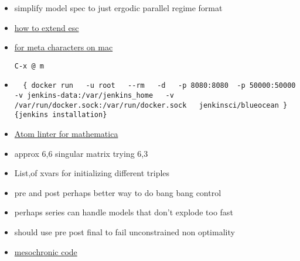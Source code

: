 \documentclass[hyperref]{labbook}
\begin{document}
\begin{itemize}
\item simplify model spec to just ergodic parallel regime format
\end{itemize}


\begin{itemize}
\item \href{https://emacs.stackexchange.com/questions/3992/how-to-extend-the-esc-m-translation-to-non-character-keys}{how to extend esc}
\item \href{https://emacs.stackexchange.com/questions/3971/how-to-type-org-modes-m-bindings-in-emacs-for-mac}{for meta characters on mac}
\begin{verbatim}
C-x @ m
\end{verbatim}

\item
\begin{verbatim}
  { docker run   -u root   --rm   -d   -p 8080:8080  -p 50000:50000  -v jenkins-data:/var/jenkins_home   -v /var/run/docker.sock:/var/run/docker.sock   jenkinsci/blueocean }{jenkins installation}

\end{verbatim}
\end{itemize}


\begin{itemize}
\item \href{https://atom.io/packages/linter-mathematica}{Atom linter for mathematica}
\end{itemize}

\begin{itemize}
\item approx 6,6 singular matrix  trying 6,3
\end{itemize}

\begin{itemize}
\item List,of xvars for initializing different triples
\item pre and post perhaps better way to do bang bang control
\item perhaps series can handle models that don't explode too fast
\item should use pre post final to fail unconstrained non optimality
\end{itemize}

\begin{itemize}
\item \href{http://people.clarkson.edu/~mbudisic/software.html}{mesochronic code}
\end{itemize}
\end{document}
